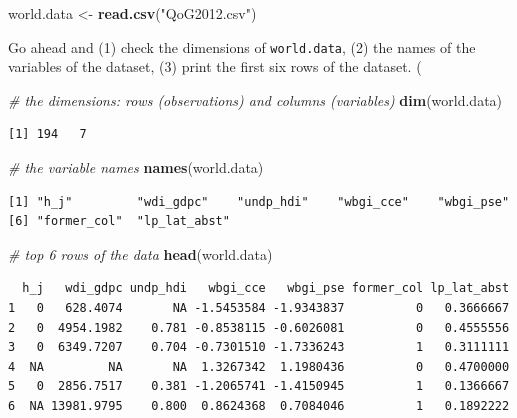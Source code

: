 \documentclass[]{book}
\newenvironment{Shaded}{\begin{snugshade}}{\end{snugshade}}
\newcommand{\KeywordTok}[1]{\textcolor[rgb]{0.13,0.29,0.53}{\textbf{#1}}}
\newcommand{\StringTok}[1]{\textcolor[rgb]{0.31,0.60,0.02}{#1}}
\newcommand{\CommentTok}[1]{\textcolor[rgb]{0.56,0.35,0.01}{\textit{#1}}}
\newcommand{\NormalTok}[1]{#1}
\theoremstyle{definition}
\theoremstyle{definition}
\theoremstyle{definition}
\theoremstyle{remark}
\begin{document}
\begin{Shaded}
\begin{Highlighting}[]
\NormalTok{world.data <-}\StringTok{ }\KeywordTok{read.csv}\NormalTok{(}\StringTok{"QoG2012.csv"}\NormalTok{)}
\end{Highlighting}
\end{Shaded}

Go ahead and (1) check the dimensions of \texttt{world.data}, (2) the
names of the variables of the dataset, (3) print the first six rows of
the dataset. (

\begin{Shaded}
\begin{Highlighting}[]
\CommentTok{# the dimensions: rows (observations) and columns (variables) }
\KeywordTok{dim}\NormalTok{(world.data)}
\end{Highlighting}
\end{Shaded}

\begin{verbatim}
[1] 194   7
\end{verbatim}

\begin{Shaded}
\begin{Highlighting}[]
\CommentTok{# the variable names}
\KeywordTok{names}\NormalTok{(world.data) }
\end{Highlighting}
\end{Shaded}

\begin{verbatim}
[1] "h_j"         "wdi_gdpc"    "undp_hdi"    "wbgi_cce"    "wbgi_pse"   
[6] "former_col"  "lp_lat_abst"
\end{verbatim}

\begin{Shaded}
\begin{Highlighting}[]
\CommentTok{# top 6 rows of the data}
\KeywordTok{head}\NormalTok{(world.data)}
\end{Highlighting}
\end{Shaded}

\begin{verbatim}
  h_j   wdi_gdpc undp_hdi   wbgi_cce   wbgi_pse former_col lp_lat_abst
1   0   628.4074       NA -1.5453584 -1.9343837          0   0.3666667
2   0  4954.1982    0.781 -0.8538115 -0.6026081          0   0.4555556
3   0  6349.7207    0.704 -0.7301510 -1.7336243          1   0.3111111
4  NA         NA       NA  1.3267342  1.1980436          0   0.4700000
5   0  2856.7517    0.381 -1.2065741 -1.4150945          1   0.1366667
6  NA 13981.9795    0.800  0.8624368  0.7084046          1   0.1892222
\end{verbatim}
\end{document}

